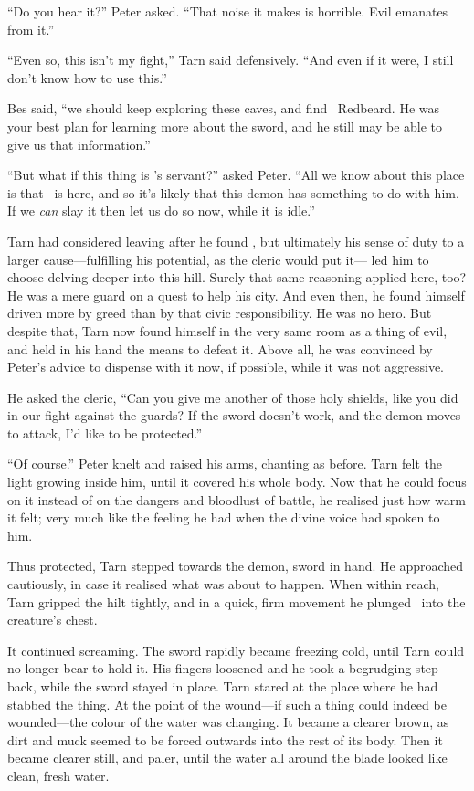 ``Do you hear it?''  Peter asked.  ``That noise it makes is horrible.  Evil emanates from it.''

``Even so, this isn't my fight,'' Tarn said defensively.  ``And even if it were, I still don't know how to use this.''

Bes said, ``we should keep exploring these caves, and find \mothzam\ Redbeard.  He was your best plan for learning more about the sword, and he still may be able to give us that information.''

``But what if this thing is \mothzam's servant?'' asked Peter.  ``All we know about this place is that \mothzam\ is here, and so it's likely that this demon has something to do with him.  If we \emph{can} slay it then let us do so now, while it is idle.''

Tarn had considered leaving after he found \kildir, but ultimately his sense of duty to a larger cause---fulfilling his potential, as the cleric would put it--- led him to choose delving deeper into this hill.  Surely that same reasoning applied here, too?  He was a mere guard on a quest to help his city.  And even then, he found himself driven more by greed than by that civic responsibility. He was no hero. But despite that, Tarn now found himself in the very same room as a thing of evil, and held in his hand the means to defeat it.  Above all, he was convinced by Peter's advice to dispense with it now, if possible, while it was not aggressive.

He asked the cleric, ``Can you give me another of those holy shields, like you did in our fight against the guards?  If the sword doesn't work, and the demon moves to attack, I'd like to be protected.''

``Of course.''  Peter knelt and raised his arms, chanting as before.  Tarn felt the light growing inside him, until it covered his whole body.  Now that he could focus on it instead of on the dangers and bloodlust of battle, he realised just how warm it felt; very much like the feeling he had when the divine voice had spoken to him.

Thus protected, Tarn stepped towards the demon, sword in hand.  He approached cautiously, in case it realised what was about to happen.  When within reach, Tarn gripped the hilt tightly, and in a quick, firm movement he plunged \kildir\ into the creature's chest.

It continued screaming.  The sword rapidly became freezing cold, until Tarn could no longer bear to hold it.  His fingers loosened and he took a begrudging step back, while the sword stayed in place.  Tarn stared at the place where he had stabbed the thing.  At the point of the wound---if such a thing could indeed be wounded---the colour of the water was changing.  It became a clearer brown, as dirt and muck seemed to be forced outwards into the rest of its body.  Then it became clearer still, and paler, until the water all around the blade looked like clean, fresh water.

